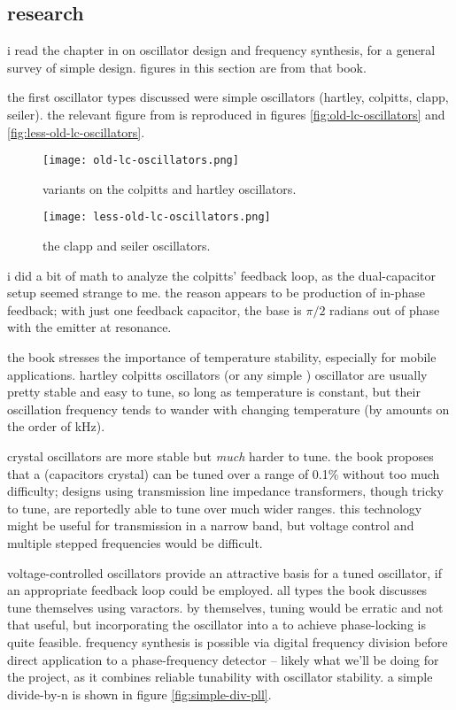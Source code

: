 \subsection*{research}
i read the chapter in \autocite{experimental-rf} on oscillator design and
frequency synthesis, for a general survey of simple \vco design. figures in
this section are from that book.

the first oscillator types discussed were simple \lc oscillators (hartley,
colpitts, clapp, seiler). the relevant figure from \autocite{experimental-rf}
is reproduced in figures \ref{fig:old-lc-oscillators} and
\ref{fig:less-old-lc-oscillators}.

\begin{figure}[H]
	\centering
	\texttt{[image: old-lc-oscillators.png]}
	\caption{variants on the colpitts and hartley oscillators.}
	\label{fig:lc-oscillators}
\end{figure}

\begin{figure}[H]
	\centering
	\texttt{[image: less-old-lc-oscillators.png]}
	\caption{the clapp and seiler oscillators.}
	\label{fig:lc-oscillators}
\end{figure}

i did a bit of math to analyze the colpitts' feedback loop, as the
dual-capacitor setup seemed strange to me. the reason appears to be production
of in-phase feedback; with just one feedback capacitor, the base is \(\pi/2\)
radians out of phase with the emitter at resonance.

the book stresses the importance of temperature stability, especially for
mobile applications. hartley \amp colpitts oscillators (or any simple \lc)
oscillator are usually pretty stable and easy to tune, so long as temperature
is constant, but their oscillation frequency tends to wander with changing
temperature (by amounts on the order of kHz).

crystal oscillators are more stable but \emph{much} harder to tune. the book
proposes that a \vxo (capacitors \amp crystal) can be tuned over a range of
0.1\% without too much difficulty; designs using transmission line impedance
transformers, though tricky to tune, are reportedly able to tune over much
wider ranges. this technology might be useful for \fm transmission in a narrow
band, but voltage control and multiple stepped frequencies would be difficult.

voltage-controlled \lc oscillators provide an attractive basis for a tuned
oscillator, if an appropriate feedback loop could be employed. all types the
book discusses tune themselves using varactors. by themselves, tuning would be
erratic and not that useful, but incorporating the oscillator into a \pll to
achieve phase-locking is quite feasible. frequency synthesis is possible via
digital frequency division before direct application to a phase-frequency
detector -- likely what we'll be doing for the project, as it combines reliable
tunability with oscillator stability. a simple divide-by-n \pll is shown in
figure \ref{fig:simple-div-pll}.


